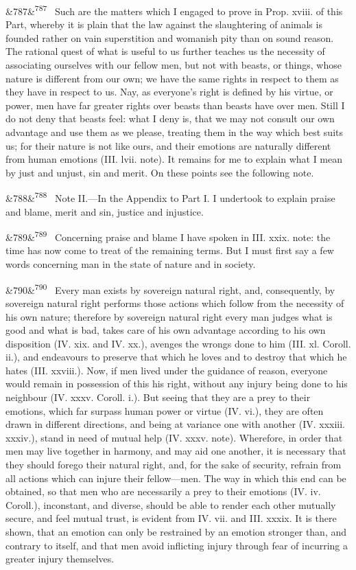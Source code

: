 \documentclass[12pt]{article}
\newcommand{\para}[1][]{\par\noindent\ifx&#1&\else\textsuperscript{\footnotesize #1}~\fi}
\begin{document}
\para[787] Such are the matters which I engaged to prove in Prop. xviii. of this Part, whereby it is plain that the law against the slaughtering of animals is founded rather on vain superstition and womanish pity than on sound reason. The rational quest of what is useful to us further teaches us the necessity of associating ourselves with our fellow men, but not with beasts, or things, whose nature is different from our own; we have the same rights in respect to them as they have in respect to us. Nay, as everyone's right is defined by his virtue, or power, men have far greater rights over beasts than beasts have over men. Still I do not deny that beasts feel: what I deny is, that we may not consult our own advantage and use them as we please, treating them in the way which best suits us; for their nature is not like ours, and their emotions are naturally different from human emotions (III. lvii. note). It remains for me to explain what I mean by just and unjust, sin and merit. On these points see the following note.

\para[788] Note II.---In the Appendix to Part I. I undertook to explain praise and blame, merit and sin, justice and injustice.

\para[789] Concerning praise and blame I have spoken in III. xxix. note: the time has now come to treat of the remaining terms. But I must first say a few words concerning man in the state of nature and in society.

\para[790] Every man exists by sovereign natural right, and, consequently, by sovereign natural right performs those actions which follow from the necessity of his own nature; therefore by sovereign natural right every man judges what is good and what is bad, takes care of his own advantage according to his own disposition (IV. xix. and IV. xx.), avenges the wrongs done to him (III. xl. Coroll. ii.), and endeavours to preserve that which he loves and to destroy that which he hates (III. xxviii.). Now, if men lived under the guidance of reason, everyone would remain in possession of this his right, without any injury being done to his neighbour (IV. xxxv. Coroll. i.). But seeing that they are a prey to their emotions, which far surpass human power or virtue (IV. vi.), they are often drawn in different directions, and being at variance one with another (IV. xxxiii. xxxiv.), stand in need of mutual help (IV. xxxv. note). Wherefore, in order that men may live together in harmony, and may aid one another, it is necessary that they should forego their natural right, and, for the sake of security, refrain from all actions which can injure their fellow---men. The way in which this end can be obtained, so that men who are necessarily a prey to their emotions (IV. iv. Coroll.), inconstant, and diverse, should be able to render each other mutually secure, and feel mutual trust, is evident from IV. vii. and III. xxxix. It is there shown, that an emotion can only be restrained by an emotion stronger than, and contrary to itself, and that men avoid inflicting injury through fear of incurring a greater injury themselves.
\end{document}
